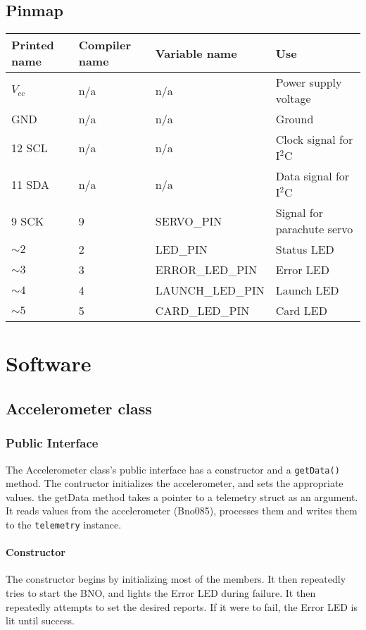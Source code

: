 \documentclass{article}
\begin{document}
\subsection*{Pinmap}
\begin{table}[H]
\begin{tabular}{llll}
Printed name & Compiler name & Variable name & Use \\
\hline
$V_{cc}$ & n/a & n/a & Power supply voltage \\
GND & n/a & n/a & Ground \\
12 SCL & n/a & n/a & Clock signal for I$^2$C \\
11 SDA & n/a & n/a & Data signal for I$^2$C \\
9 SCK & 9 & SERVO\_PIN & Signal for parachute servo \\
$\sim2$ & 2 & LED\_PIN & Status LED \\
$\sim3$ & 3 & ERROR\_LED\_PIN & Error LED \\
$\sim4$ & 4 & LAUNCH\_LED\_PIN & Launch LED \\
$\sim5$ & 5 & CARD\_LED\_PIN & Card LED \\
\end{tabular}
\end{table}

\section*{Software}

\subsection{Accelerometer class}

\subsubsection*{Public Interface}
The Accelerometer class's public interface has a constructor and a \verb|getData()| method. The contructor initializes the accelerometer, and sets the appropriate values.
the getData method takes a pointer to a telemetry struct as an argument. It reads values from the accelerometer (Bno085), processes them and writes them to the \verb|telemetry| instance.

\paragraph*{Constructor}
The constructor begins by initializing most of the members. It then repeatedly tries to start the BNO, and lights the Error LED during failure. It then repeatedly attempts
to set the desired reports. If it were to fail, the Error LED is lit until success.
\end{document}
